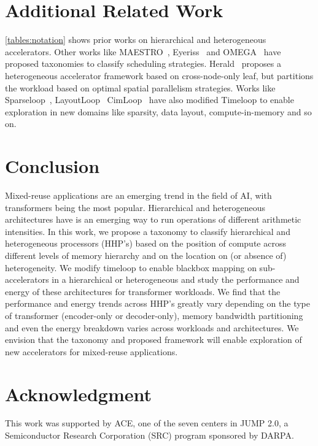 \section{Additional Related Work}

\autoref{tables:notation} shows prior works on hierarchical and heterogeneous accelerators. Other works like MAESTRO~\cite{kwon2019understanding}, Eyeriss~\cite{eyeriss2016isca} and OMEGA~\cite{garg2021understanding} have proposed taxonomies to classify scheduling strategies. Herald~\cite{kwon2021heterogeneous} proposes a heterogeneous accelerator framework based on cross-node-only leaf, but partitions the workload based on optimal spatial parallelism strategies. Works like Sparseloop~\cite{sparseloop}, %
LayoutLoop~\cite{feather}
CimLoop~\cite{cimloop} have also modified Timeloop to enable exploration in new domains like sparsity, data layout, compute-in-memory and so on.

\section{Conclusion}
\label{sec:discussion}

Mixed-reuse applications are an emerging trend in the field of AI, with transformers being the most popular. Hierarchical and heterogeneous architectures have is an emerging way to run operations of different arithmetic intensities. In this work, we propose a taxonomy to classify hierarchical and heterogeneous processors (HHP's) based on the position of compute across different levels of memory hierarchy and on the location on (or absence of) heterogeneity. We modify timeloop to enable blackbox mapping on sub-accelerators in a hierarchical or heterogeneous and study the performance and energy of these architectures for transformer workloads. We find that the performance and energy trends across HHP's greatly vary depending on the type of transformer (encoder-only or decoder-only), memory bandwidth partitioning and even the energy breakdown varies across workloads and architectures.  We envision that the taxonomy and proposed framework will enable exploration of new accelerators for mixed-reuse applications.

\section*{Acknowledgment}
This work was supported by ACE, one of the seven centers in JUMP 2.0, a
Semiconductor Research Corporation (SRC) program sponsored by DARPA.
